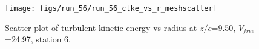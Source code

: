 \begin{figure}[H]
\centering
\texttt{[image: figs/run\_56/run\_56\_ctke\_vs\_r\_meshscatter]}
\caption{Scatter plot of turbulent kinetic energy vs radius at $z/c$=9.50, $V_{free}$=24.97, station 6.}
\label{fig:run_56_ctke_vs_r_meshscatter}
\end{figure}



